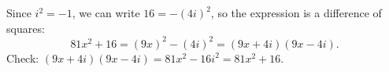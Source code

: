 Since $i^2=-1$, we can write $16=-(4i)^2$, so the expression is a difference of squares:
\[
81x^2+16=(9x)^2-(4i)^2=\boxed{(9x+4i)(9x-4i)}.
\]
Check: $(9x+4i)(9x-4i)=81x^2-16i^2=81x^2+16$.
